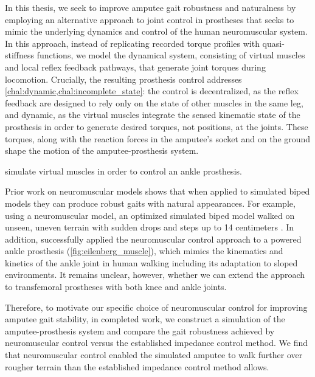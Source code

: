 In this thesis, we seek to improve amputee gait robustness and naturalness by
employing an alternative approach to joint control in prostheses that seeks to
mimic the underlying dynamics and control of the human neuromuscular system. In
this approach, instead of replicating recorded torque profiles with
quasi-stiffness functions, we model the dynamical system, consisting of virtual
muscles and local reflex feedback pathways, that generate joint torques during
locomotion.  Crucially, the resulting prosthesis control addresses
\cref{chal:dynamic,chal:incomplete_state}: the control is decentralized, as the
reflex feedback are designed to rely only on the state of other muscles in the
same leg, and dynamic, as the virtual muscles integrate the sensed kinematic
state of the prosthesis in order to generate desired torques, not positions, at
the joints. These torques, along with the reaction forces in the amputee's
socket and on the ground shape the motion of the amputee-prosthesis system.
\begin{marginfigure}
    \centering
    \caption{\citet{eilenberg2010control} simulate virtual muscles in
    order to control an ankle prosthesis.}
    \label{fig:eilenberg_muscle}
\end{marginfigure}

Prior work on neuromuscular models shows that when applied to simulated biped
models they can produce robust gaits with natural appearances. For example,
using a neuromuscular model, an optimized simulated biped model walked on
unseen, uneven terrain with sudden drops and steps up to 14 centimeters
\citep{song2015neural}. In addition, \citet{eilenberg2010control} successfully
applied the neuromuscular control approach to a powered ankle prosthesis
(\cref{fig:eilenberg_muscle}), which mimics the kinematics and kinetics of the
ankle joint in human walking including its adaptation to sloped environments. It
remains unclear, however, whether we can extend the approach to transfemoral
prostheses with both knee and ankle joints.

Therefore, to motivate our specific choice of neuromuscular control for
improving amputee gait stability, in completed work, we construct a simulation
of the amputee-prosthesis system and compare the gait robustness achieved by
neuromuscular control versus the established impedance control method. We find
that neuromuscular control enabled the simulated amputee to walk further over
rougher terrain than the established impedance control method allows.

